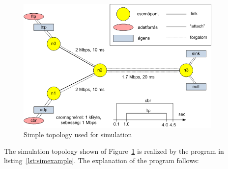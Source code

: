 \documentclass[a4paper]{article}
\begin{document}
\begin{figure}[H]
    \centering
    \includegraphics[width=0.9\textwidth]{figures/topology-new.png}
    \caption{Simple topology used for simulation}
    \label{fig:simplesim}
\end{figure}

The simulation topology shown of Figure~\ref{fig:simplesim} is realized by the program in listing~\ref{lst:simexample}.
The explanation of the program follows:
\end{document}
